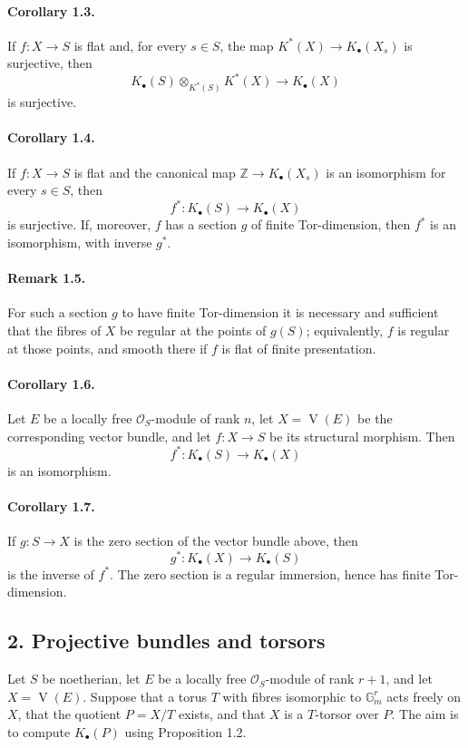 \documentclass[12pt]{article}
\newcommand{\ZZ}{\mathbb Z}
\newcommand{\GG}{\mathbb G}
\newcommand{\cO}{\mathcal O}
\newcommand{\VV}{\operatorname{V}}
\newcommand{\longto}{\longrightarrow}
\begin{document}
\paragraph{Corollary 1.3.}
If $f:X\to S$ is flat and, for every $s\in S$, the map $K^*(X)\to K_\bullet(X_s)$ is surjective, then
\[
K_\bullet(S)\otimes_{K^*(S)}K^*(X)\longto K_\bullet(X)
\]
is surjective.

\paragraph{Corollary 1.4.}
If $f:X\to S$ is flat and the canonical map $\ZZ\to K_\bullet(X_s)$ is an isomorphism for every $s\in S$, then
\[
f^*:K_\bullet(S)\longto K_\bullet(X)
\]
is surjective. If, moreover, $f$ has a section $g$ of finite Tor-dimension, then $f^*$ is an isomorphism, with inverse $g^*$.

\paragraph{Remark 1.5.}
For such a section $g$ to have finite Tor-dimension it is necessary and sufficient that the fibres of $X$ be regular at the points of $g(S)$; equivalently, $f$ is regular at those points, and smooth there if $f$ is flat of finite presentation.

\paragraph{Corollary 1.6.}
Let $E$ be a locally free $\cO_S$-module of rank $n$, let $X=\VV(E)$ be the corresponding vector bundle, and let $f:X\to S$ be its structural morphism. Then
\[
f^*:K_\bullet(S)\longto K_\bullet(X)
\]
is an isomorphism.

\paragraph{Corollary 1.7.}
If $g:S\to X$ is the zero section of the vector bundle above, then
\[
g^*:K_\bullet(X)\longto K_\bullet(S)
\]
is the inverse of $f^*$. The zero section is a regular immersion, hence has finite Tor-dimension.

\subsection*{2. Projective bundles and torsors}

Let $S$ be noetherian, let $E$ be a locally free $\cO_S$-module of rank $r+1$, and let $X=\VV(E)$. Suppose that a torus $T$ with fibres isomorphic to $\GG_m^r$ acts freely on $X$, that the quotient $P=X/T$ exists, and that $X$ is a $T$-torsor over $P$. The aim is to compute $K_\bullet(P)$ using Proposition 1.2.
\end{document}
